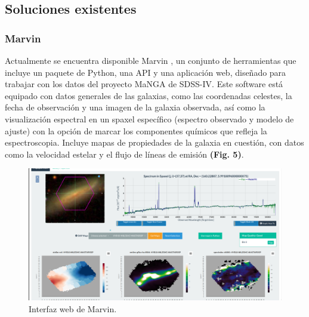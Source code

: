 \documentclass[10pt,twocolumn,a4paper]{opticajnl}
\begin{document}
\subsection*{Soluciones existentes}
 \subsubsection*{Marvin}
Actualmente se encuentra disponible Marvin \cite{marvin}, un conjunto de herramientas que incluye un paquete de Python, una API y una aplicación web, diseñado para trabajar con los datos del proyecto MaNGA de SDSS-IV. Este software está equipado con datos generales de las galaxias, como las coordenadas celestes, la fecha de observación y una imagen de la galaxia observada, así como la visualización espectral en un spaxel específico (espectro observado y modelo de ajuste) con la opción de marcar los componentes químicos que refleja la espectroscopia. Incluye mapas de propiedades de la galaxia en cuestión, con datos como la velocidad estelar y el flujo de líneas de emisión \textbf{(Fig. 5)}.
\begin{figure}
	\centering
  	\includegraphics[width=0.8\linewidth]{interfaceMarvin}
	\caption{Interfaz web de Marvin.}
	\label{fig:interfacemarvin}
\end{figure}
\end{document}
